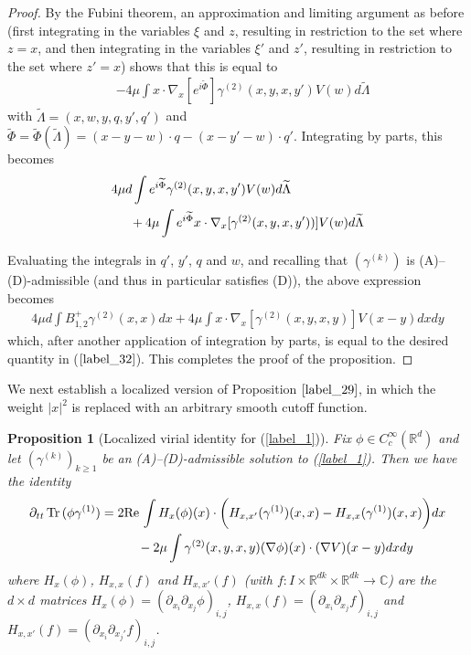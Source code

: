 \documentclass[reqno]{amsart}
\numberwithin{equation}{section}
\newtheorem{proposition}[theorem]{Proposition}
\theoremstyle{remark}
\DeclareMathOperator{\Tr}{Tr\,}
\begin{document}
\begin{proof}
By the Fubini theorem, an approximation and limiting argument as before (first integrating in the variables $\xi$ and $z$, resulting in restriction to the set where $z=x$, and then integrating in the variables $\xi'$ and $z'$, resulting in restriction to the set where $z'=x$) shows that this is equal to 
\begin{align*}
&-4\mu \int x\cdot \nabla_x[e^{i\widetilde{\Phi}}]\gamma^{(2)}(x,y,x,y')V(w)d\widetilde{\Lambda}
\end{align*}
with $\widetilde{\Lambda}=(x,w,y,q,y',q')$ and $\widetilde{\Phi}=\widetilde{\Phi}(\widetilde{\Lambda})=(x-y-w)\cdot q-(x-y'-w)\cdot q'$.  Integrating by parts, this becomes
\begin{align*}
&4\mu d\int e^{i\widetilde{\Phi}}\gamma^{(2)}(x,y,x,y')V(w)d\widetilde{\Lambda}\\
&\hspace{0.2in}+4\mu\int e^{i\widetilde{\Phi}}x\cdot \nabla_x[\gamma^{(2)}(x,y,x,y'))]V(w)d\widetilde{\Lambda}
\end{align*}

Evaluating the integrals in $q'$, $y'$, $q$ and $w$, and recalling that $(\gamma^{(k)})$ is (A)--(D)-admissible (and thus in particular satisfies (D)), the above expression becomes
\begin{align*}
4\mu d \int B^+_{1,2}\gamma^{(2)}(x,x)dx+4\mu\int x\cdot \nabla_x[\gamma^{(2)}(x,y,x,y)]V(x-y)dxdy
\end{align*}
which, after another application of integration by parts, is equal to the desired quantity in ($\ref{label_32}$).
This completes the proof of the proposition.
\end{proof}

We next establish a localized version of Proposition $\ref{label_29}$, in which the weight $|x|^2$ is replaced with an arbitrary smooth cutoff function.

\begin{proposition}[Localized virial identity for (\ref{label_1})]
\label{label_34}
Fix $\phi\in C_c^\infty(\mathbb{R}^d)$ and let $(\gamma^{(k)})_{k\geq 1}$ be an (A)--(D)-admissible solution to (\ref{label_1}).  Then we have the identity
\begin{align*}
\partial_{tt}\Tr(\phi\gamma^{(1)})&=2\textrm{Re}\,\int H_{x}(\phi)(x)\cdot \bigg(H_{x,x'}(\gamma^{(1)})(x,x)-H_{x,x}(\gamma^{(1)})(x,x)\bigg)dx\\
&\hspace{0.4in}-2\mu \int \gamma^{(2)}(x,y,x,y)(\nabla \phi)(x)\cdot (\nabla V)(x-y)dxdy
\end{align*}
where $H_x(\phi)$, $H_{x,x}(f)$ and $H_{x,x'}(f)$ (with $f:I\times\mathbb{R}^{dk}\times \mathbb{R}^{dk}\rightarrow \mathbb{C}$) are the $d\times d$ matrices $H_x(\phi)=(\partial_{x_i}\partial_{x_j}\phi)_{i,j}$, $H_{x,x}(f)=(\partial_{x_i}\partial_{x_j}f)_{i,j}$ and $H_{x,x'}(f)=(\partial_{x_i}\partial_{x_j'}f)_{i,j}$.
\end{proposition}
\end{document}
